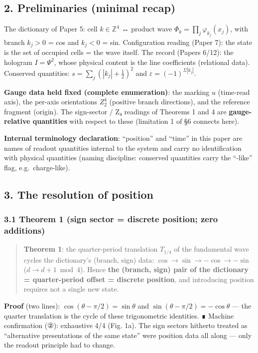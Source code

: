 \documentclass[
]{ltjsarticle}
\begin{document}
\subsection{2. Preliminaries (minimal
recap)}\label{preliminaries-minimal-recap}

The dictionary of Paper 5: cell \(k\in\mathbb{Z}^4\) ↔ product wave
\(\Phi_k=\prod_j\varphi_{k_j}(x_j)\), with branch \(k_j>0\) = cos and
\(k_j<0\) = sin. Configuration reading (Paper 7): the state is the set
of occupied cells = the wave itself. The record (Papers 6/12): the
hologram \(I=\Psi^2\), whose physical content is the line coefficients
(relational data). Conserved quantities: \(s=\sum_j(|k_j|+\tfrac12)^2\)
and \(\varepsilon=(-1)^{\Sigma|k_j|}\).

\textbf{Gauge data held fixed (complete enumeration)}: the marking \(u\)
(time-read axis), the per-axis orientations \(Z_2^{4}\) (positive branch
directions), and the reference fragment (origin). The sign-sector / Z₄
readings of Theorems 1 and 4 are \textbf{gauge-relative quantities} with
respect to these (limitation 1 of §6 connects here).

\textbf{Internal terminology declaration}: ``position'' and ``time'' in
this paper are names of readout quantities internal to the system and
carry no identification with physical quantities (naming discipline:
conserved quantities carry the ``-like'' flag, e.g.~charge-like).

\subsection{3. The resolution of
position}\label{the-resolution-of-position}

\subsubsection{3.1 Theorem 1 (sign sector = discrete position; zero
additions)}\label{theorem-1-sign-sector-discrete-position-zero-additions}

\begin{quote}
\textbf{Theorem 1}: the quarter-period translation \(T_{1/4}\) of the
fundamental wave cycles the dictionary's (branch, sign) data:
\(\cos\to\sin\to-\cos\to-\sin\) (\(d\to d+1\bmod4\)). Hence \textbf{the
(branch, sign) pair of the dictionary = quarter-period offset = discrete
position}, and introducing position requires not a single new state.
\end{quote}

\textbf{Proof} (two lines): \(\cos(\theta-\pi/2)=\sin\theta\) and
\(\sin(\theta-\pi/2)=-\cos\theta\) --- the quarter translation is the
cycle of these trigonometric identities. ∎ Machine confirmation (②):
exhaustive 4/4 (Fig. 1a). The sign sectors hitherto treated as
``alternative presentations of the same state'' were position data all
along --- only the readout principle had to change.
\end{document}
